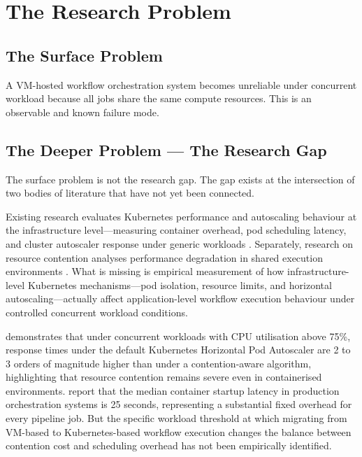 
\section{The Research Problem}
\label{sec:research-problem}

\subsection{The Surface Problem}
\label{subsec:surface-problem}

A VM-hosted workflow orchestration system becomes unreliable under concurrent workload because all jobs share the same compute resources. This is an observable and known failure mode.

\subsection{The Deeper Problem --- The Research Gap}
\label{subsec:research-gap}

The surface problem is not the research gap. The gap exists at the intersection of two bodies of literature that have not yet been connected.

Existing research evaluates Kubernetes performance and autoscaling behaviour at the infrastructure level---measuring container overhead, pod scheduling latency, and cluster autoscaler response under generic workloads \citep{casalicchio2019, nguyen2020, tran2022}. Separately, research on resource contention analyses performance degradation in shared execution environments \citep{nanda1991, arora2023}. What is missing is empirical measurement of how infrastructure-level Kubernetes mechanisms---pod isolation, resource limits, and horizontal autoscaling---actually affect application-level workflow execution behaviour under controlled concurrent workload conditions.

\citet{casalicchio2019} demonstrates that under concurrent workloads with CPU utilisation above 75\%, response times under the default Kubernetes Horizontal Pod Autoscaler are 2 to 3 orders of magnitude higher than under a contention-aware algorithm, highlighting that resource contention remains severe even in containerised environments. \citet{choi2021} report that the median container startup latency in production orchestration systems is 25 seconds, representing a substantial fixed overhead for every pipeline job. But the specific workload threshold at which migrating from VM-based to Kubernetes-based workflow execution changes the balance between contention cost and scheduling overhead has not been empirically identified.

